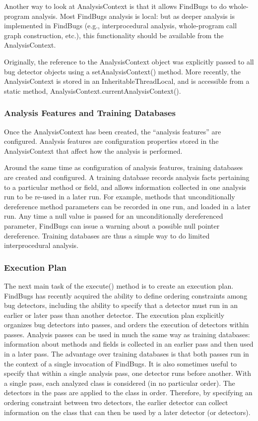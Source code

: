 \documentclass[11pt]{article}
\begin{document}
Another way to look at AnalysisContext is that it allows FindBugs to do
whole-program analysis.  Most FindBugs analysis is local: but as deeper
analysis is implemented in FindBugs (e.g., interprocedural analysis,
whole-program call graph construction, etc.), this functionality should
be available from the AnalysisContext.

Originally, the reference to the AnalysisContext object was explicitly
passed to all bug detector objects using a setAnalysisContext() method.
More recently, the AnalysisContext is stored in an InheritableThreadLocal, and is accessible
from a static method, AnalysisContext.currentAnalysisContext().

\subsubsection{Analysis Features and Training Databases}

Once the AnalysisContext has been created, the ``analysis features'' are configured.
Analysis features are configuration properties stored in the AnalysisContext that
affect how the analysis is performed.

Around the same time as configuration of analysis features, training
databases are created and configured.  A training database records analysis facts
pertaining to a particular method or field, and allows information collected
in one analysis run to be re-used in a later run.  For example, methods that
unconditionally dereference method parameters can be recorded in one run,
and loaded in a later run.  Any time a null value is passed for an unconditionally
dereferenced parameter, FindBugs can issue a warning about a possible null pointer
dereference.  Training databases are thus a simple way to do limited interprocedural
analysis.

\subsubsection{Execution Plan}

The next main task of the execute() method is to create an execution plan.
FindBugs has recently acquired the ability to define ordering constraints
among bug detectors, including the ability to specify that a detector must
run in an earlier or later pass than another detector.
The execution plan explicitly organizes bug detectors into passes,
and orders the execution of detectors within passes.
Analysis passes can be used in much the same way as training databases:
information about methods and fields is collected in an earlier pass
and then used in a later pass.  The advantage over training databases
is that both passes run in the context of a single
invocation of FindBugs.
It is also sometimes useful to specify that within a single analysis pass,
one detector runs before another.  With a single pass, each analyzed class
is considered (in no particular order).  The detectors in the pass are
applied to the class in order.  Therefore, by specifying an ordering
constraint between two detectors, the earlier detector can collect information
on the class that can then be used by a later detector (or detectors).
\end{document}
